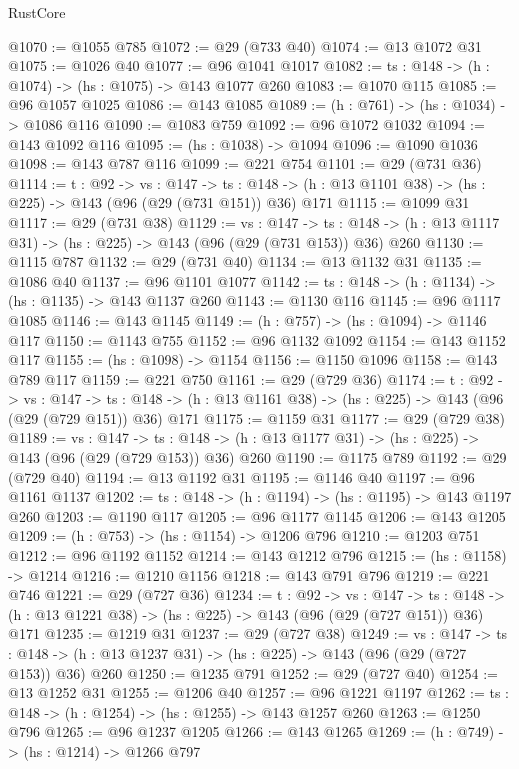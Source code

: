 \begin{lexlean}{RustCore}
\begin{coremodule}
{\begin{coremodule}
{{{@1070 := @1055 @785
@1072 := @29 (@733 @40)
@1074 := @13 @1072 @31
@1075 := @1026 @40
@1077 := @96 @1041 @1017
@1082 := {ts : @148} -> (h : @1074) -> (hs : @1075) -> @143 @1077 @260
@1083 := @1070 @115
@1085 := @96 @1057 @1025
@1086 := @143 @1085
@1089 := (h : @761) -> (hs : @1034) -> @1086 @116
@1090 := @1083 @759
@1092 := @96 @1072 @1032
@1094 := @143 @1092 @116
@1095 := (hs : @1038) -> @1094
@1096 := @1090 @1036
@1098 := @143 @787 @116
@1099 := @221 @754
@1101 := @29 (@731 @36)
@1114 := {t : @92} ->
  {vs : @147} ->
  {ts : @148} -> (h : @13 @1101 @38) -> (hs : @225) -> @143 (@96 (@29 (@731 @151)) @36) @171
@1115 := @1099 @31
@1117 := @29 (@731 @38)
@1129 := {vs : @147} ->
  {ts : @148} -> (h : @13 @1117 @31) -> (hs : @225) -> @143 (@96 (@29 (@731 @153)) @36) @260
@1130 := @1115 @787
@1132 := @29 (@731 @40)
@1134 := @13 @1132 @31
@1135 := @1086 @40
@1137 := @96 @1101 @1077
@1142 := {ts : @148} -> (h : @1134) -> (hs : @1135) -> @143 @1137 @260
@1143 := @1130 @116
@1145 := @96 @1117 @1085
@1146 := @143 @1145
@1149 := (h : @757) -> (hs : @1094) -> @1146 @117
@1150 := @1143 @755
@1152 := @96 @1132 @1092
@1154 := @143 @1152 @117
@1155 := (hs : @1098) -> @1154
@1156 := @1150 @1096
@1158 := @143 @789 @117
@1159 := @221 @750
@1161 := @29 (@729 @36)
@1174 := {t : @92} ->
  {vs : @147} ->
  {ts : @148} -> (h : @13 @1161 @38) -> (hs : @225) -> @143 (@96 (@29 (@729 @151)) @36) @171
@1175 := @1159 @31
@1177 := @29 (@729 @38)
@1189 := {vs : @147} ->
  {ts : @148} -> (h : @13 @1177 @31) -> (hs : @225) -> @143 (@96 (@29 (@729 @153)) @36) @260
@1190 := @1175 @789
@1192 := @29 (@729 @40)
@1194 := @13 @1192 @31
@1195 := @1146 @40
@1197 := @96 @1161 @1137
@1202 := {ts : @148} -> (h : @1194) -> (hs : @1195) -> @143 @1197 @260
@1203 := @1190 @117
@1205 := @96 @1177 @1145
@1206 := @143 @1205
@1209 := (h : @753) -> (hs : @1154) -> @1206 @796
@1210 := @1203 @751
@1212 := @96 @1192 @1152
@1214 := @143 @1212 @796
@1215 := (hs : @1158) -> @1214
@1216 := @1210 @1156
@1218 := @143 @791 @796
@1219 := @221 @746
@1221 := @29 (@727 @36)
@1234 := {t : @92} ->
  {vs : @147} ->
  {ts : @148} -> (h : @13 @1221 @38) -> (hs : @225) -> @143 (@96 (@29 (@727 @151)) @36) @171
@1235 := @1219 @31
@1237 := @29 (@727 @38)
@1249 := {vs : @147} ->
  {ts : @148} -> (h : @13 @1237 @31) -> (hs : @225) -> @143 (@96 (@29 (@727 @153)) @36) @260
@1250 := @1235 @791
@1252 := @29 (@727 @40)
@1254 := @13 @1252 @31
@1255 := @1206 @40
@1257 := @96 @1221 @1197
@1262 := {ts : @148} -> (h : @1254) -> (hs : @1255) -> @143 @1257 @260
@1263 := @1250 @796
@1265 := @96 @1237 @1205
@1266 := @143 @1265
@1269 := (h : @749) -> (hs : @1214) -> @1266 @797
}}}
\end{coremodule}}
\end{coremodule}
\end{lexlean}
